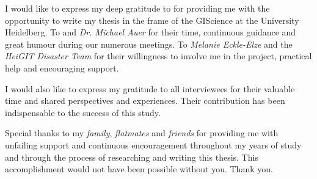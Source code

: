 \documentclass[
11pt, %
oneside, %
english, %
onehalfspacing, %
nolistspacing, %
parskip, %
headsepline, %
]{MastersDoctoralThesis} %
\begin{document}

\begin{acknowledgements}
\addchaptertocentry{\acknowledgementname} %
\vspace{1cm}

I would like to express my deep gratitude to \examname for providing me with the opportunity to write my thesis in the frame of the GIScience at the University Heidelberg.\newline
To \supname and \textit{Dr. Michael Auer} for their time, continuous guidance and great humour during our numerous meetings.\newline
To \textit{Melanie Eckle-Elze} and the \textit{HeiGIT Disaster Team} for their willingness to involve me in the project, practical help and encouraging support.

I would also like to express my gratitude to all interviewees for their valuable time and shared perspectives and experiences. Their contribution has been indispensable to the success of this study.

Special thanks to my \textit{family}, \textit{flatmates} and \textit{friends} for providing me with unfailing support and continuous encouragement throughout my years of study and through the process of researching and writing this thesis. This accomplishment would not have been possible without you. Thank you.

\end{acknowledgements}


\tableofcontents %

\listoffigures %

\listoftables %


\end{document}

